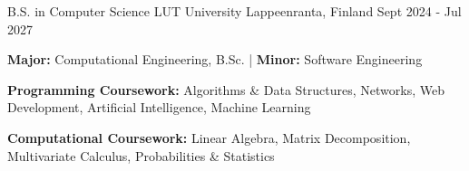 

\begin{cventries}

  \vspace{-0.3mm}
  \cventryalt
    {B.S. in Computer Science} %
    {LUT University} %
    {Lappeenranta, Finland} %
    {Sept 2024 - Jul 2027} %
    {
      \begin{cvitems} %
        \item {\textbf{Major:} Computational Engineering, B.Sc. | \textbf{Minor:} Software Engineering}
        \item {\textbf{Programming Coursework:} Algorithms \& Data Structures, Networks, Web Development, Artificial Intelligence, Machine Learning}
        \item {\textbf{Computational Coursework:} Linear Algebra, Matrix Decomposition, Multivariate Calculus, Probabilities \& Statistics}
      \end{cvitems}
    }
\end{cventries}
\vspace{-3.0mm}